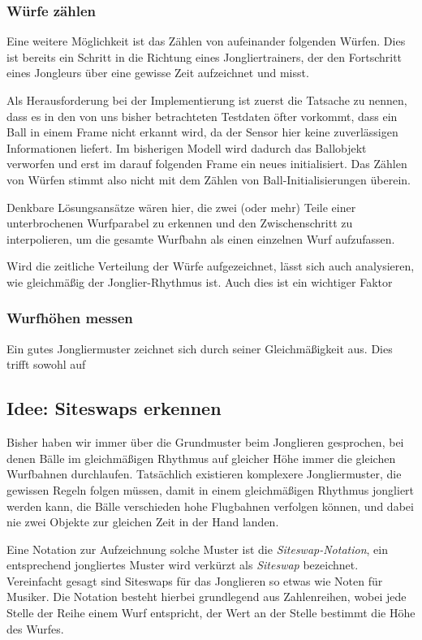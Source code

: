 \documentclass[12pt,a4paper,ngerman]{scrartcl}
\begin{document}
\subsubsection{Würfe zählen}

Eine weitere Möglichkeit ist das Zählen von aufeinander folgenden Würfen. Dies ist
bereits ein Schritt in die Richtung eines Jongliertrainers, der den Fortschritt eines
Jongleurs über eine gewisse Zeit aufzeichnet und misst.

Als Herausforderung bei der Implementierung ist zuerst die Tatsache zu nennen, dass
es in den von uns bisher betrachteten Testdaten öfter vorkommt, dass ein Ball in
einem Frame nicht erkannt wird, da der Sensor hier keine zuverlässigen Informationen
liefert. Im bisherigen Modell wird dadurch das Ballobjekt verworfen und erst im
darauf folgenden Frame ein neues initialisiert. Das Zählen von Würfen stimmt
also nicht mit dem Zählen von Ball-Initialisierungen überein.

Denkbare Lösungsansätze wären hier, die zwei (oder mehr) Teile einer unterbrochenen
Wurfparabel zu erkennen und den Zwischenschritt zu interpolieren, um die gesamte
Wurfbahn als einen einzelnen Wurf aufzufassen.

Wird die zeitliche Verteilung der Würfe aufgezeichnet, lässt sich auch analysieren,
wie gleichmäßig der Jonglier-Rhythmus ist. Auch dies ist ein wichtiger Faktor

\subsubsection{Wurfhöhen messen}

Ein gutes Jongliermuster zeichnet sich durch seiner Gleichmäßigkeit aus. Dies trifft
sowohl auf

\subsection{Idee: Siteswaps erkennen}

Bisher haben wir immer über die Grundmuster beim Jonglieren gesprochen, bei denen
Bälle im gleichmäßigen Rhythmus auf gleicher Höhe immer die gleichen Wurfbahnen
durchlaufen. Tatsächlich existieren komplexere Jongliermuster, die gewissen Regeln
folgen müssen, damit in einem gleichmäßigen Rhythmus jongliert werden kann, die Bälle
verschieden hohe Flugbahnen verfolgen können, und dabei nie zwei Objekte zur gleichen
Zeit in der Hand landen.

Eine Notation zur Aufzeichnung solche Muster ist die \textit{Siteswap-Notation}, ein
entsprechend jongliertes Muster wird verkürzt als \textit{Siteswap} bezeichnet.
Vereinfacht gesagt sind Siteswaps für das Jonglieren so etwas wie Noten für Musiker.
Die Notation besteht hierbei grundlegend aus Zahlenreihen, wobei jede Stelle der
Reihe einem Wurf entspricht, der Wert an der Stelle bestimmt die Höhe des Wurfes.
\end{document}
